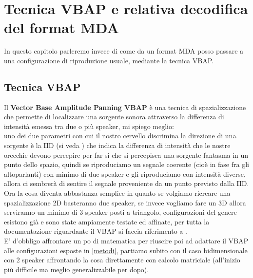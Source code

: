 \documentclass[12pt,a4paper]{report}
\begin{document}
\chapter{Tecnica VBAP e relativa decodifica del format MDA}

In questo capitolo parleremo invece di come da un format MDA posso passare a una configurazione di riproduzione usuale, mediante la tecnica VBAP.\\

\section{Tecnica VBAP}
 
Il \textbf{Vector Base Amplitude Panning VBAP} è una tecnica di spazializzazione che permette di localizzare una sorgente sonora attraverso la differenza di intensità emessa tra due o più speaker, mi spiego meglio:\\
uno dei due parametri con cui il nostro cervello discrimina la direzione di una sorgente è la IID (si veda \cite{iid}) che indica la differenza di intensità che le nostre orecchie devono percepire per far si che si percepisca una sorgente fantasma in un punto dello spazio, quindi se riproduciamo un segnale coerente (cioè in fase fra gli altoparlanti) con minimo di due speaker e gli riproduciamo con intensità diverse, allora ci sembrerà di sentire il segnale proveniente da un punto previsto dalla IID.\\

Ora la cosa diventa abbastanza semplice in quanto se volgiamo ricreare una spazializzazione 2D basteranno due speaker, se invece vogliamo fare un 3D allora serviranno un minimo di 3 speaker posti a triangolo, configurazioni del genere esistono già e sono state ampiamente testate ed affinate, per tutta la documentazione riguardante il VBAP si faccia riferimento a \cite{vbap}.\\

E' d'obbligo affrontare un po di matematica per riuscire poi ad adattare il VBAP alle configurazioni esposte in \ref{metodi}, partiamo subito con il caso bidimensionale con 2 speaker affrontando la cosa direttamente con calcolo matriciale (all'inizio più difficile ma meglio generalizzabile per dopo).\\
\end{document}
